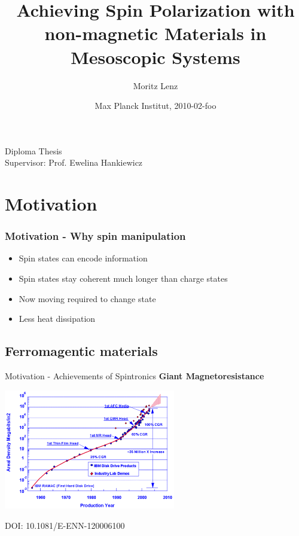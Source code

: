 \documentclass{beamer}
\title{Achieving Spin Polarization with non-magnetic Materials in Mesoscopic
Systems}
\author{Moritz Lenz}
\institute{Institut für Theoretische Physik und Astrophysik, Universität
Würzburg}
\date{Max Planck Institut, 2010-02-foo}
\begin{document}
\begin{frame}
  \titlepage

  \begin{center}
{ 	
	 Diploma Thesis\\[1.5em]
}
    Supervisor: Prof. Ewelina Hankiewicz

\end{center}

%

\end{frame}

\section{Motivation}

\begin{frame}
    \frametitle{Motivation - Why spin manipulation}

	\begin{itemize}
		\item Spin states can encode information
		\item Spin states stay coherent much longer than charge states
        \item Now moving required to change state
        \item Less heat dissipation
	\end{itemize}

\end{frame}

\subsection{Ferromagentic materials}

\begin{frame}{Motivation - Achievements of Spintronics}
        \textbf{Giant Magnetoresistance}

    \includegraphics[width=75mm]{storage-density.png}

    \footnotesize DOI: 10.1081/E-ENN-120006100
\end{frame}
\end{document}
